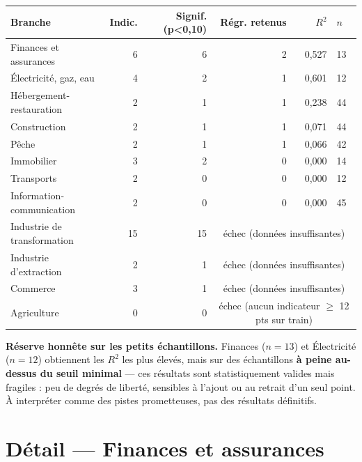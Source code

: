 \documentclass[11pt,a4paper]{article}
\begin{document}
\begin{center}
\small
\begin{tabular}{lrrrrl}
\toprule
\textbf{Branche} & \textbf{Indic.} & \textbf{Signif. (p<0,10)} & \textbf{Régr. retenus} & \textbf{$R^2$} & \textbf{$n$} \\
\midrule
Finances et assurances & 6 & 6 & 2 & 0,527 & 13 \\
Électricité, gaz, eau & 4 & 2 & 1 & 0,601 & 12 \\
Hébergement-restauration & 2 & 1 & 1 & 0,238 & 44 \\
Construction & 2 & 1 & 1 & 0,071 & 44 \\
Pêche & 2 & 1 & 1 & 0,066 & 42 \\
Immobilier & 3 & 2 & 0 & 0,000 & 14 \\
Transports & 2 & 0 & 0 & 0,000 & 12 \\
Information-communication & 2 & 0 & 0 & 0,000 & 45 \\
\midrule
Industrie de transformation & 15 & 15 & \multicolumn{3}{c}{échec (données insuffisantes)} \\
Industrie d'extraction & 2 & 1 & \multicolumn{3}{c}{échec (données insuffisantes)} \\
Commerce & 3 & 1 & \multicolumn{3}{c}{échec (données insuffisantes)} \\
Agriculture & 0 & 0 & \multicolumn{3}{c}{échec (aucun indicateur $\geq$ 12 pts sur train)} \\
\bottomrule
\end{tabular}
\end{center}

\begin{alertebox}
\textbf{Réserve honnête sur les petits échantillons.} Finances ($n=13$) et Électricité ($n=12$) obtiennent les $R^2$ les plus élevés, mais sur des échantillons \textbf{à peine au-dessus du seuil minimal} --- ces résultats sont statistiquement valides mais fragiles : peu de degrés de liberté, sensibles à l'ajout ou au retrait d'un seul point. À interpréter comme des pistes prometteuses, pas des résultats définitifs.
\end{alertebox}

\section{Détail --- Finances et assurances}
\end{document}
